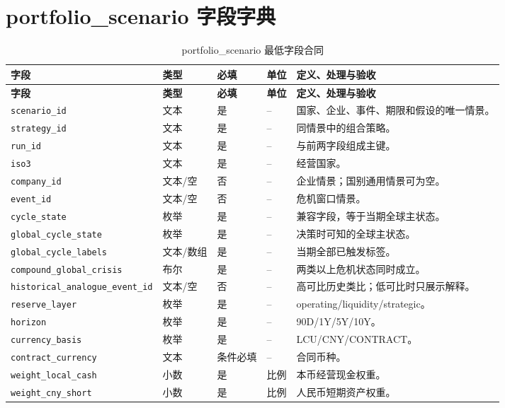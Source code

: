 \documentclass[UTF8,fontset=windows,12pt,openany]{ctexbook}
\newcommand{\Field}[1]{{\small\nolinkurl{#1}}}
\begin{document}
\chapter{portfolio\_scenario 字段字典}
\clearpage
\begin{landscape}
\begin{longtable}{p{4.0cm}p{2.2cm}p{2.2cm}p{2.5cm}p{7.4cm}}
\caption{portfolio\_scenario 最低字段合同}\label{tab:dict-portfolio}\\
\toprule
\textbf{字段} & \textbf{类型} & \textbf{必填} & \textbf{单位} & \textbf{定义、处理与验收}\\
\midrule
\endfirsthead
\toprule \textbf{字段} & \textbf{类型} & \textbf{必填} & \textbf{单位} & \textbf{定义、处理与验收}\\ \midrule
\endhead
\Field{scenario_id} & 文本 & 是 & -- & 国家、企业、事件、期限和假设的唯一情景。\\
\Field{strategy_id} & 文本 & 是 & -- & 同情景中的组合策略。\\
\Field{run_id} & 文本 & 是 & -- & 与前两字段组成主键。\\
\Field{iso3} & 文本 & 是 & -- & 经营国家。\\
\Field{company_id} & 文本/空 & 否 & -- & 企业情景；国别通用情景可为空。\\
\Field{event_id} & 文本/空 & 否 & -- & 危机窗口情景。\\
\Field{cycle_state} & 枚举 & 是 & -- & 兼容字段，等于当期全球主状态。\\
\Field{global_cycle_state} & 枚举 & 是 & -- & 决策时可知的全球主状态。\\
\Field{global_cycle_labels} & 文本/数组 & 是 & -- & 当期全部已触发标签。\\
\Field{compound_global_crisis} & 布尔 & 是 & -- & 两类以上危机状态同时成立。\\
\Field{historical_analogue_event_id} & 文本/空 & 否 & -- & 高可比历史类比；低可比时只展示解释。\\
\Field{reserve_layer} & 枚举 & 是 & -- & operating/liquidity/strategic。\\
\Field{horizon} & 枚举 & 是 & -- & 90D/1Y/5Y/10Y。\\
\Field{currency_basis} & 枚举 & 是 & -- & LCU/CNY/CONTRACT。\\
\Field{contract_currency} & 文本 & 条件必填 & -- & 合同币种。\\
\Field{weight_local_cash} & 小数 & 是 & 比例 & 本币经营现金权重。\\
\Field{weight_cny_short} & 小数 & 是 & 比例 & 人民币短期资产权重。\\

\end{longtable}
\end{landscape}
\end{document}
